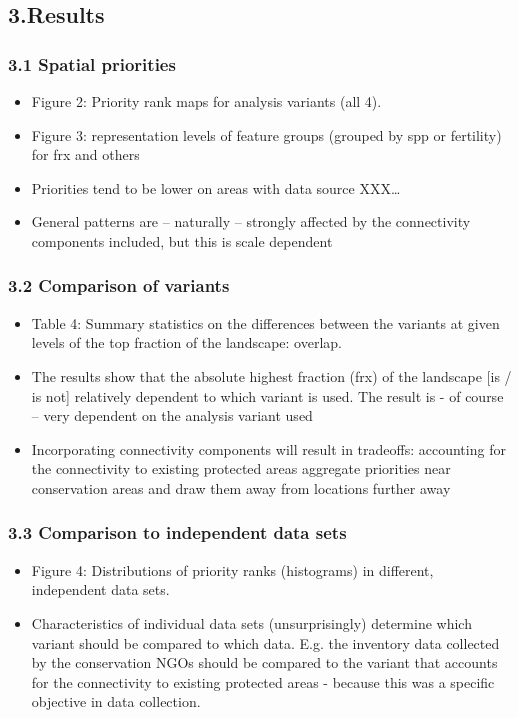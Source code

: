 \documentclass[]{article}
\begin{document}
\subsection{3.Results}

\subsubsection{3.1 Spatial priorities}

\begin{itemize}
\itemsep1pt\parskip0pt
\item
  Figure 2: Priority rank maps for analysis variants (all 4).
\item
  Figure 3: representation levels of feature groups (grouped by spp or
  fertility) for frx and others
\item
  Priorities tend to be lower on areas with data source XXX\ldots{}
\item
  General patterns are -- naturally -- strongly affected by the
  connectivity components included, but this is scale dependent
\end{itemize}

\subsubsection{3.2 Comparison of variants}

\begin{itemize}
\itemsep1pt\parskip0pt
\item
  Table 4: Summary statistics on the differences between the variants at
  given levels of the top fraction of the landscape: overlap.
\item
  The results show that the absolute highest fraction (frx) of the
  landscape {[}is / is not{]} relatively dependent to which variant is
  used. The result is - of course -- very dependent on the analysis
  variant used
\item
  Incorporating connectivity components will result in tradeoffs:
  accounting for the connectivity to existing protected areas aggregate
  priorities near conservation areas and draw them away from locations
  further away
\end{itemize}

\subsubsection{3.3 Comparison to independent data sets}

\begin{itemize}
\itemsep1pt\parskip0pt
\item
  Figure 4: Distributions of priority ranks (histograms) in different,
  independent data sets.
\item
  Characteristics of individual data sets (unsurprisingly) determine
  which variant should be compared to which data. E.g. the inventory
  data collected by the conservation NGOs should be compared to the
  variant that accounts for the connectivity to existing protected areas
  - because this was a specific objective in data collection.
\end{itemize}
\end{document}
